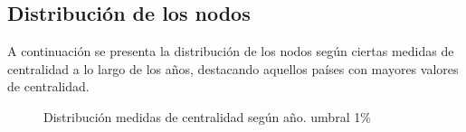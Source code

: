 \documentclass[a4paper]{article}
\begin{document}
\subsection{Distribución de los nodos}

A continuación se presenta la distribución de los nodos según ciertas medidas de centralidad a lo largo de los años, destacando aquellos países con mayores valores de centralidad. 


\begin{figure}
\centering
{}


    
\caption{Distribución medidas de centralidad según año. umbral 1\%}
\label{fig:distribuciones}
\end{figure}
\end{document}
